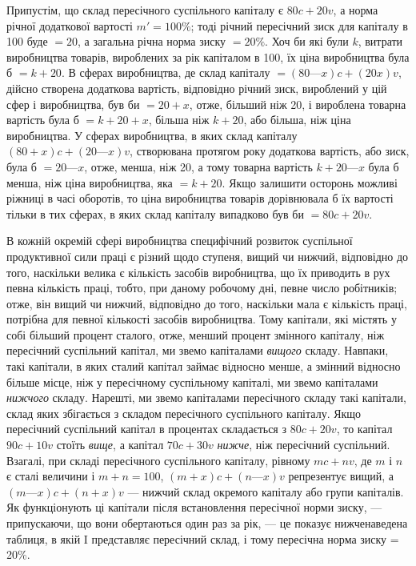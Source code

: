 Припустім, що склад пересічного суспільного капіталу є
$80 c + 20 v$, а норма річної додаткової вартості $m' = 100\%$; тоді
річний пересічний зиск для капіталу в 100 буде $= 20$, а загальна
річна норма зиску $= 20\%$. Хоч би які були $k$, витрати виробництва
товарів, вироблених за рік капіталом в 100, їх ціна виробництва була б $= k + 20$. В сферах
виробництва, де склад капіталу $= (80 — x) c + (20 x) v$, дійсно створена додаткова вартість,
відповідно річний зиск, вироблений у цій сфер і виробництва,
був би $= 20 + x$, отже, більший ніж 20, і вироблена
товарна вартість була б $= k + 20 + x$, більша ніж $k + 20$, або
більша, ніж ціна виробництва. У сферах виробництва, в яких
склад капіталу $(80 + x) c + (20 — x) v$, створювана протягом року
додаткова вартість, або зиск, була б $= 20 — x$, отже, менша, ніж 20,
а тому товарна вартість $k + 20 — x$ була б менша, ніж ціна виробництва, яка $= k + 20$. Якщо залишити
осторонь можливі ріжниці в часі оборотів, то ціна виробництва товарів дорівнювала б їх вартості
тільки в тих сферах, в яких склад капіталу випадково був би $= 80 c + 20 v$.

В кожній окремій сфері виробництва специфічний розвиток
суспільної продуктивної сили праці є різний щодо ступеня,
вищий чи нижчий, відповідно до того, наскільки велика є кількість засобів виробництва, що їх
приводить в рух певна кількість праці, тобто, при даному робочому дні, певне число робітників; отже,
він вищий чи нижчий, відповідно до того, наскільки
мала є кількість праці, потрібна для певної кількості засобів
виробництва. Тому капітали, які містять у собі більший процент
сталого, отже, менший процент змінного капіталу, ніж пересічний суспільний капітал, ми звемо
капіталами \emph{вищого} складу.
Навпаки, такі капітали, в яких сталий капітал займає відносно
менше, а змінний відносно більше місце, ніж у пересічному
суспільному капіталі, ми звемо капіталами \emph{нижчого} складу.
Нарешті, ми звемо капіталами пересічного складу такі капітали,
склад яких збігається з складом пересічного суспільного капіталу. Якщо пересічний суспільний капітал
в процентах складається з $80 c + 20 v$, то капітал $90 c + 10 v$ стоїть \emph{вище}, а капітал $70 c + 30 v$
\emph{нижче}, ніж пересічний суспільний. Взагалі, при
складі пересічного суспільного капіталу, рівному $mc + nv$, де
$m$ і $n$ є сталі величини і $m + n = 100$, $(m + x) c + (n — x) v$ репрезентує вищий, а $(m — x) c + (n + x)
v$ — нижчий склад окремого капіталу або групи капіталів. Як функціонують ці капітали після
встановлення пересічної норми зиску, — припускаючи, що
вони обертаються один раз за рік, — це показує нижченаведена
таблиця, в якій I представляє пересічний склад, і тому пересічна норма зиску = 20\%.

